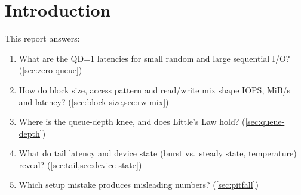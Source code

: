 \section{Introduction}\label{sec:intro}


This report answers:
\begin{enumerate}
  \item What are the QD=1 latencies for small random and large sequential I/O? (\cref{sec:zero-queue})
  \item How do block size, access pattern and read/write mix shape IOPS, MiB/s and latency?
        (\cref{sec:block-size,sec:rw-mix})
  \item Where is the queue-depth knee, and does Little's Law hold? (\cref{sec:queue-depth})
  \item What do tail latency and device state (burst vs.\ steady state, temperature) reveal?
        (\cref{sec:tail,sec:device-state})
  \item Which setup mistake produces misleading numbers? (\cref{sec:pitfall})
\end{enumerate}

